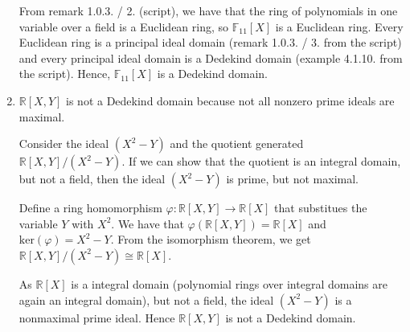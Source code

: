 \documentclass[a4paper]{article}
\theoremstyle{definition}
\begin{document}
\begin{enumerate}
    From remark 1.0.3. / 2. (script), we have that the ring of polynomials in one variable over a field is a Euclidean ring, so \(\mathbb{F}_{11}[X]\) is a Euclidean ring. Every Euclidean ring is a principal ideal domain (remark 1.0.3. / 3. from the script) and every principal ideal domain is a Dedekind domain (example 4.1.10. from the script). Hence, \(\mathbb{F}_{11}[X]\) is a Dedekind domain.
    \item \(\mathbb{R}[X, Y]\) is not a Dedekind domain because not all nonzero prime ideals are maximal.

    Consider the ideal \((X^2 - Y)\) and the quotient generated \(\mathbb{R}[X, Y] / (X^2 - Y)\). If we can show that the quotient is an integral domain, but not a field, then the ideal \((X^2 - Y)\) is prime, but not maximal.

    Define a ring homomorphism \(\varphi: \mathbb{R}[X, Y] \rightarrow \mathbb{R}[X]\) that substitues the variable \(Y\) with \(X^2\). We have that \(\varphi(\mathbb{R}[X, Y]) = \mathbb{R}[X]\) and \(\text{ker}(\varphi) = X^2 - Y\). From the isomorphism theorem, we get \(\mathbb{R}[X, Y] / (X^2 - Y) \cong \mathbb{R}[X]\).

    As \(\mathbb{R}[X]\) is a integral domain (polynomial rings over integral domains are again an integral domain), but not a field, the ideal \((X^2 - Y)\) is a nonmaximal prime ideal. Hence \(\mathbb{R}[X, Y]\) is not a Dedekind domain.
\end{enumerate}
\end{document}
